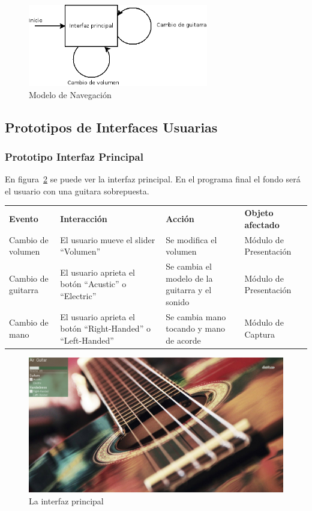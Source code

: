 \documentclass[a4paper,12pt]{article}
\begin{document}
\begin{figure}[hb]
        \centering
        \includegraphics[width=0.7\textwidth]{../imagenes/modelo_de_navegacion.png}
        \caption{Modelo de Navegación}
        \label{fig:navegacion}
\end{figure}
\subsection{Prototipos de Interfaces Usuarias}
\subsubsection{Prototipo Interfaz Principal}
En figura~\ref{fig:ui} se puede ver la interfaz principal. En el programa final
el fondo será el usuario con una guitara sobrepuesta.

\begin{tabularx}{\textwidth}{X X X X}
        \textbf{Evento} & \textbf{Interacción} & \textbf{Acción} & \textbf{Objeto afectado} \\
        Cambio de volumen & El usuario mueve el slider ``Volumen'' & Se
        modifica el volumen & Módulo de Presentación \\
        Cambio de guitarra & El usuario aprieta el botón ``Acustic'' o
        ``Electric'' & Se cambia el modelo de la guitarra y el sonido & Módulo
        de Presentación \\
        Cambio de mano & El usuario aprieta el botón ``Right-Handed'' o
        ``Left-Handed'' & Se cambia mano tocando y mano de acorde & Módulo
        de Captura \\


\end{tabularx}
\begin{figure}[hb]
        \centering
        \includegraphics[width=\textwidth]{../imagenes/ui.png}
        \caption{La interfaz principal}
        \label{fig:ui}
\end{figure}
\newpage
\end{document}
